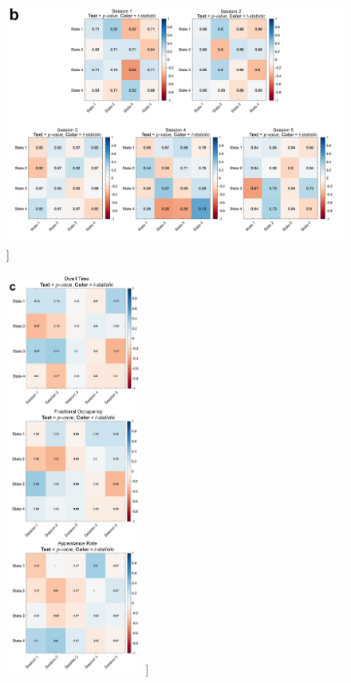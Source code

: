 \documentclass[phd,tocprelim]{cornell}
\renewcommand{\caption}[1]{\singlespacing\hangcaption{#1}\normalspacing}
\begin{document}
\begin{figure}[h!]
		\ContinuedFloat
		\captionsetup{labelformat=adja-page}
    \centering
    \includegraphics[width=1\textwidth]{chapter2/SupplementaryFig9b.png}
    \caption[]{}
\end{figure}
\null
\vfill
\clearpage
\null
\vfill
\begin{figure}[h!]
		\ContinuedFloat
		\captionsetup{labelformat=adja-page}
    \centering
    \includegraphics[width=0.4\textwidth]{chapter2/SupplementaryFig9c.png}
    \caption[]{}
\end{figure}
\end{document}
